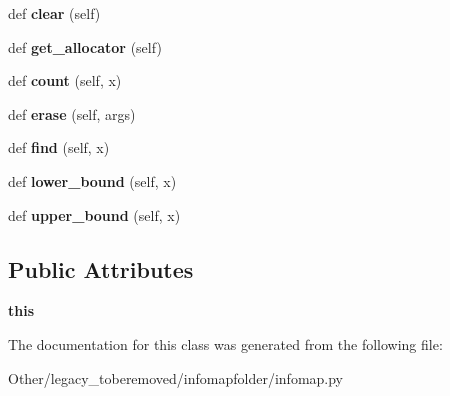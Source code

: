 \begin{DoxyCompactItemize}
def {\bfseries clear} (self)
\item 
\mbox{\label{classinfomapfolder_1_1infomap_1_1StateNodeMap_a75ebe1b963cad9195d5a82f67586ed11}} 
def {\bfseries get\+\_\+allocator} (self)
\item 
\mbox{\label{classinfomapfolder_1_1infomap_1_1StateNodeMap_ab300056f2def81f01a58caccb155bf62}} 
def {\bfseries count} (self, x)
\item 
\mbox{\label{classinfomapfolder_1_1infomap_1_1StateNodeMap_a7767aaed9acea095c69ea4fdcb744062}} 
def {\bfseries erase} (self, args)
\item 
\mbox{\label{classinfomapfolder_1_1infomap_1_1StateNodeMap_a42f62f2e0e9cc17669bb8f437460c06c}} 
def {\bfseries find} (self, x)
\item 
\mbox{\label{classinfomapfolder_1_1infomap_1_1StateNodeMap_a6bf984812a784c973a7be7803623f345}} 
def {\bfseries lower\+\_\+bound} (self, x)
\item 
\mbox{\label{classinfomapfolder_1_1infomap_1_1StateNodeMap_afdd787c42d28df128c0bbd5c54330579}} 
def {\bfseries upper\+\_\+bound} (self, x)
\end{DoxyCompactItemize}
\subsection*{Public Attributes}
\begin{DoxyCompactItemize}
\item 
\mbox{\label{classinfomapfolder_1_1infomap_1_1StateNodeMap_a7ba696fdf1c49a4ee4a35973697f9398}} 
{\bfseries this}
\end{DoxyCompactItemize}


The documentation for this class was generated from the following file\+:\begin{DoxyCompactItemize}
\item 
Other/legacy\+\_\+toberemoved/infomapfolder/infomap.\+py\end{DoxyCompactItemize}
